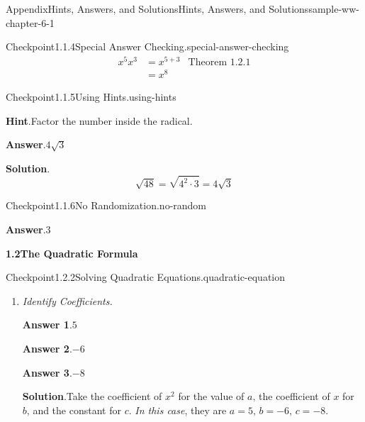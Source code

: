 \documentclass[oneside,10pt,]{book}
\newcommand{\blocktitlefont}{\relax}
\newcommand{\lititle}[1]{{\slshape#1}}
\numberwithin{equation}{section}
\newcommand{\amp}{&}
\begin{document}
\begin{solutions-chapter}{Appendix}{Hints, Answers, and Solutions}{}{Hints, Answers, and Solutions}{}{}{sample-ww-chapter-6-1}
\begin{inlinesolution}{Checkpoint}{1.1.4}{Special Answer Checking.}{special-answer-checking}
%
\begin{equation*}
\begin{aligned}
{x^{5}x^{3}}\amp =x^{5+3}\amp \text{Theorem 1.2.1}\\
\amp =x^{8}
\end{aligned}
\end{equation*}
%
\end{inlinesolution}%
\begin{inlinesolution}{Checkpoint}{1.1.5}{Using Hints.}{using-hints}%
\par\smallskip%
\noindent\textbf{\blocktitlefont Hint}.\hypertarget{using-hints-3-back}{}\quad{}Factor the number inside the radical.%
\par\smallskip%
\noindent\textbf{\blocktitlefont Answer}.\hypertarget{using-hints-4-back}{}\quad{}\(4\sqrt{3}\)%
\par\smallskip%
\noindent\textbf{\blocktitlefont Solution}.\hypertarget{using-hints-5-back}{}\quad{}%
\begin{equation*}
{\sqrt{48}}=\sqrt{4^2\cdot 3}=4\sqrt{3}
\end{equation*}
%
\end{inlinesolution}%
\begin{inlinesolution}{Checkpoint}{1.1.6}{No Randomization.}{no-random}%
\par\smallskip%
\noindent\textbf{\blocktitlefont Answer}.\hypertarget{no-random-3-back}{}\quad{}\(3\)%
\end{inlinesolution}%
\par\medskip
\noindent\textbf{\Large{}1.2\space\textperiodcentered\space{}The Quadratic Formula}
\begin{inlinesolution}{Checkpoint}{1.2.2}{Solving Quadratic Equations.}{quadratic-equation}%
\begin{enumerate}[font=\bfseries,label=(\alph*),ref=\alph*]%
\item[(a)]\lititle{Identify Coefficients.}\par%
\par\smallskip%
\noindent\textbf{\blocktitlefont Answer 1}.\hypertarget{quadratic-equation-3-3-back}{}\quad{}\(5\)%
\par\smallskip%
\noindent\textbf{\blocktitlefont Answer 2}.\hypertarget{quadratic-equation-3-4-back}{}\quad{}\(-6\)%
\par\smallskip%
\noindent\textbf{\blocktitlefont Answer 3}.\hypertarget{quadratic-equation-3-5-back}{}\quad{}\(-8\)%
\par\smallskip%
\noindent\textbf{\blocktitlefont Solution}.\hypertarget{quadratic-equation-3-6-back}{}\quad{}Take the coefficient of \(x^2\) for the value of \(a\text{,}\) the coefficient of \(x\) for \(b\text{,}\) and the constant for \(c\text{.}\) \emph{In this case}, they are \(a = {5}\text{,}\) \(b = {-6}\text{,}\) \(c = {-8}\text{.}\)%

\end{enumerate}
\end{inlinesolution}
\end{solutions-chapter}
\end{document}
